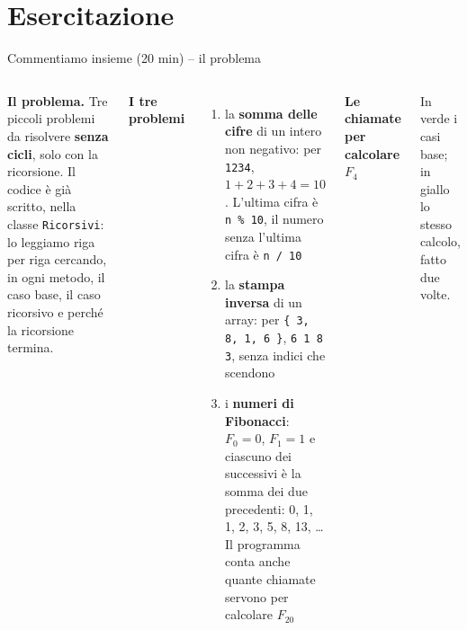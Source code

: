 \documentclass[10pt,aspectratio=169]{beamer}
\begin{document}
\section{Esercitazione}

\begin{frame}[fragile]{Commentiamo insieme (20 min) -- il problema}
\begin{columns}[T]
\footnotesize
\textbf{Il problema.} Tre piccoli problemi da risolvere \textbf{senza cicli}, solo con la ricorsione. Il codice è già scritto, nella classe \texttt{Ricorsivi}: lo leggiamo riga per riga cercando, in ogni metodo, il caso base, il caso ricorsivo e perché la ricorsione termina.

\vspace{0.1cm}
\textbf{I tre problemi}
\begin{enumerate}\itemsep=3pt
    \item la \textbf{somma delle cifre} di un intero non negativo: per \texttt{1234}, $1 + 2 + 3 + 4 = 10$. L'ultima cifra è \texttt{n \% 10}, il numero senza l'ultima cifra è \texttt{n / 10}
    \item la \textbf{stampa inversa} di un array: per \texttt{\{ 3, 8, 1, 6 \}}, \texttt{6 1 8 3}, senza indici che scendono
    \item i \textbf{numeri di Fibonacci}: $F_0 = 0$, $F_1 = 1$ e ciascuno dei successivi è la somma dei due precedenti: 0, 1, 1, 2, 3, 5, 8, 13, \ldots{} Il programma conta anche quante chiamate servono per calcolare $F_{20}$
\end{enumerate}

\footnotesize
\textbf{Le chiamate per calcolare $F_4$}
In verde i casi base; in giallo lo stesso calcolo, fatto due volte.
\end{columns}
\end{frame}
\end{document}
